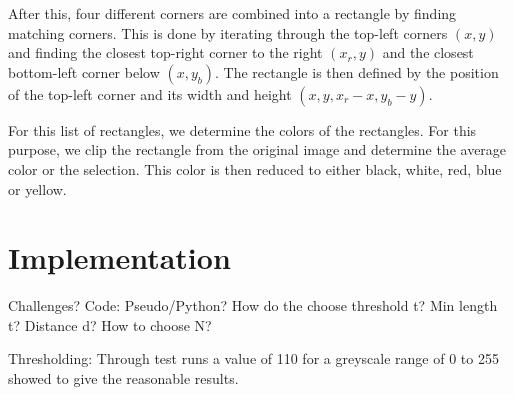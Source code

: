 After this, four different corners are combined into a rectangle by finding
matching corners. This is done by iterating through the top-left corners $(x,y)$
and finding the closest top-right corner to the right $(x_r, y)$ and the
closest bottom-left corner below $(x, y_b)$. The rectangle is then defined by
the position of the top-left corner and its width and height
$(x,y,x_r-x,y_b-y)$.

For this list of rectangles, we determine the colors of the rectangles. For this
purpose, we clip the rectangle from the original image and determine the average
color or the selection. This color is then reduced to either black, white, red,
blue or yellow.

\section{Implementation}


Challenges?
Code: Pseudo/Python?
How do the choose threshold t?
Min length t?
Distance d?
How to choose N?

Thresholding:
Through test runs a value of 110 for a greyscale range of 0 to 255
showed to give the reasonable results.
